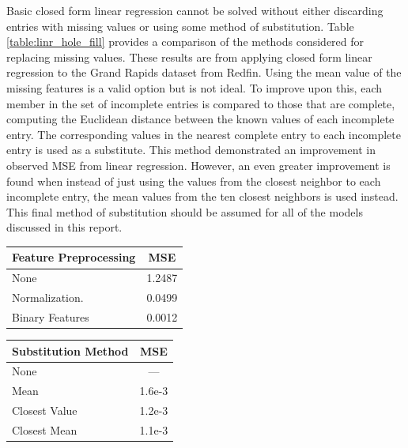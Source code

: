 \documentclass[10pt]{article}
\begin{document}
\begin{multicols}{2}
		Basic closed form linear regression cannot be solved without either discarding entries with missing values or using some method of substitution. Table \ref{table:linr_hole_fill} provides a comparison of the methods considered for replacing missing values. These results are from applying closed form linear regression to the Grand Rapids dataset from Redfin. Using the mean value of the missing features is a valid option but is not ideal. To improve upon this, each member in the set of incomplete entries is compared to those that are complete, computing the Euclidean distance between the known values of each incomplete entry. The corresponding values in the nearest complete entry to each incomplete entry is used as a substitute. This method demonstrated an improvement in observed MSE from linear regression. However, an even greater improvement is found when instead of just using the values from the closest neighbor to each incomplete entry, the mean values from the ten closest neighbors is used instead. This final method of substitution should be assumed for all of the models discussed in this report.
		\begin{center}
			\captionsetup{type=table}
			\begin{tabular}{l|c}
				Feature Preprocessing & \small{MSE} \\
				\hline
				\small{None} & \small{1.2487} \\
				\hline
				\small{Normalization.} & \small{0.0499} \\
				\hline
				\small{Binary Features} & \small{0.0012} \\
			\end{tabular}
			\label{table:linr_preprocessing}			
		\end{center}

		\begin{center}
        	\captionsetup{type=table}
			\begin{tabular}{l|c}
				Substitution Method & \small{MSE} \\
				\hline
				\small{None} & \small{---} \\
				\hline
				\small{Mean} & \small{1.6e-3} \\
				\hline
				\small{Closest Value} & \small{1.2e-3} \\
				\hline
				\small{Closest Mean} & \small{1.1e-3} \\
			\end{tabular}
			\label{table:linr_hole_fill}
		\end{center}


\end{multicols}
\end{document}
